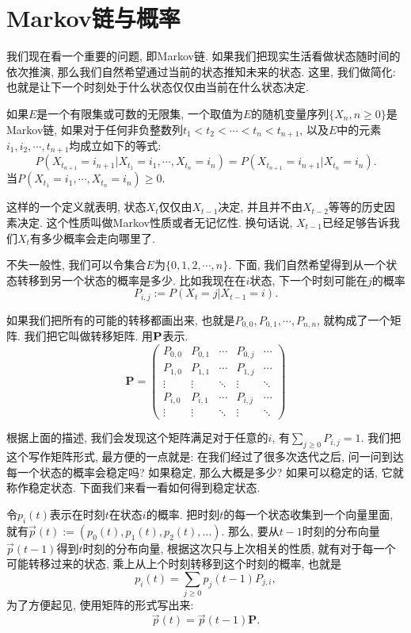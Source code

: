 \section{Markov链与概率}

我们现在看一个重要的问题, 即Markov链. 如果我们把现实生活看做状态随时间的依次推演, 那么我们自然希望通过当前的状态推知未来的状态. 这里, 我们做简化: 也就是让下一个时刻处于什么状态仅仅由当前在什么状态决定. 

\begin{definition}
    如果$E$是一个有限集或可数的无限集, 一个取值为$E$的随机变量序列$\{X_n,n\geq 0\}$是Markov链, 如果对于任何非负整数列$t_1< t_2< \cdots< t_{n}<t_{n+1}$, 以及$E$中的元素$i_1, i_2, \cdots , t_{n+1}$均成立如下的等式: 
    $$
    P(X_{t_{n+1}}=i_{n+1} | X_{t_1}=i_1, \cdots, X{_{t_n}}=i_n)=P(X_{t_{n+1}}=i_{n+1}|X_{t_n}=i_n).
    $$
    当$P(X_{t_1}=i_1, \cdots, X_{t_n}=i_n)\geq 0$. 
\end{definition}

这样的一个定义就表明, 状态$X_t$仅仅由$X_{t-1}$决定, 并且并不由$X_{t-2}$等等的历史因素决定. 这个性质叫做Markov性质或者无记忆性. 换句话说, $X_{t-1}$已经足够告诉我们$X_t$有多少概率会走向哪里了. 

不失一般性, 我们可以令集合$E$为$\{0,1,2,\cdots, n\}$. 下面, 我们自然希望得到从一个状态转移到另一个状态的概率是多少. 比如我现在在$i$状态, 下一个时刻可能在$j$的概率
$$
P_{i,j}:=P(X_t=j|X_{t-1}=i).
$$

如果我们把所有的可能的转移都画出来, 也就是$P_{0,0}, P_{0,1}, \cdots, P_{n,n}$, 就构成了一个矩阵. 我们把它叫做转移矩阵. 用$\bf P$表示.
$$
\mathbf{P}=\left(\begin{array}{ccccc}P_{0,0} & P_{0,1} & \cdots & P_{0, j} & \cdots \\ P_{1,0} & P_{1,1} & \cdots & P_{1, j} & \cdots \\ \vdots & \vdots & \ddots & \vdots & \ddots \\ P_{i, 0} & P_{i, 1} & \cdots & P_{i, j} & \cdots \\ \vdots & \vdots & \ddots & \vdots & \ddots\end{array}\right)
$$

根据上面的描述, 我们会发现这个矩阵满足对于任意的$i$, 有$\sum_{j\geq 0}P_{i,j}=1$. 我们把这个写作矩阵形式, 最方便的一点就是: 在我们经过了很多次迭代之后, 问一问到达每一个状态的概率会稳定吗? 如果稳定, 那么大概是多少? 如果可以稳定的话, 它就称作稳定状态. 下面我们来看一看如何得到稳定状态. 

令$p_i(t)$表示在时刻$t$在状态$i$的概率. 把时刻$t$的每一个状态收集到一个向量里面, 就有$\vec{p}(t):=\left(p_0(t), p_1(t), p_2(t), \ldots\right)$. 那么, 要从$t-1$时刻的分布向量$\vec{p}(t-1)$得到$t$时刻的分布向量, 根据这次只与上次相关的性质, 就有对于每一个可能转移过来的状态, 乘上从上个时刻转移到这个时刻的概率, 也就是$$p_i(t)=\sum_{j \geq 0} p_j(t-1) P_{j, i},$$ 为了方便起见, 使用矩阵的形式写出来: $$\vec{p}(t)=\vec{p}(t-1) \mathbf{P}.$$


